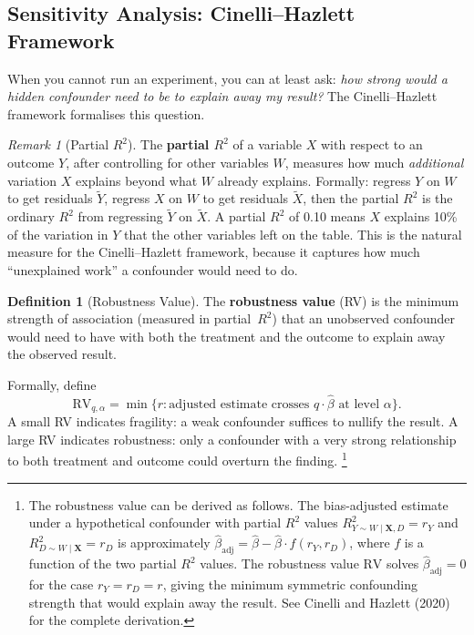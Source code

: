 \documentclass[11pt,a4paper]{article}
\theoremstyle{definition}
\newtheorem{definition}{Definition}[section]
\theoremstyle{plain}
\theoremstyle{remark}
\newtheorem{remark}{Remark}[section]
\newcommand{\bhat}{\hat{\beta}}
\begin{document}
\subsection{Sensitivity Analysis: Cinelli--Hazlett Framework}

When you cannot run an experiment, you can at least ask: \emph{how strong would a hidden confounder need to be to explain away my result?} The Cinelli--Hazlett framework formalises this question.

\begin{remark}[Partial $R^2$]
The \textbf{partial $R^2$} of a variable $X$ with respect to an outcome $Y$, after controlling for other variables $W$, measures how much \emph{additional} variation $X$ explains beyond what $W$ already explains. Formally: regress $Y$ on $W$ to get residuals $\tilde{Y}$, regress $X$ on $W$ to get residuals $\tilde{X}$, then the partial $R^2$ is the ordinary $R^2$ from regressing $\tilde{Y}$ on $\tilde{X}$. A partial $R^2$ of 0.10 means $X$ explains 10\% of the variation in $Y$ that the other variables left on the table. This is the natural measure for the Cinelli--Hazlett framework, because it captures how much ``unexplained work'' a confounder would need to do.
\end{remark}

\begin{definition}[Robustness Value]
The \textbf{robustness value} (RV) is the minimum strength of association (measured in partial~$R^2$) that an unobserved confounder would need to have with both the treatment and the outcome to explain away the observed result.
\end{definition}

Formally, define
\[
  \text{RV}_{q,\alpha} = \min\{r : \text{adjusted estimate crosses } q \cdot \bhat \text{ at level } \alpha\}.
\]
A small RV indicates fragility: a weak confounder suffices to nullify the result.
A large RV indicates robustness: only a confounder with a very strong relationship to both treatment and outcome could overturn the finding.%
\footnote{The robustness value can be derived as follows. The bias-adjusted estimate under a hypothetical confounder with partial $R^2$ values $R^2_{Y \sim W \mid \mathbf{X}, D} = r_Y$ and $R^2_{D \sim W \mid \mathbf{X}} = r_D$ is approximately $\hat\beta_{\text{adj}} = \hat\beta - \hat\beta \cdot f(r_Y, r_D)$, where $f$ is a function of the two partial $R^2$ values. The robustness value $\text{RV}$ solves $\hat\beta_{\text{adj}} = 0$ for the case $r_Y = r_D = r$, giving the minimum symmetric confounding strength that would explain away the result. See Cinelli and Hazlett (2020) for the complete derivation.}
\end{document}
